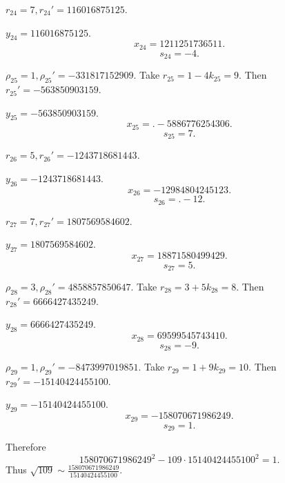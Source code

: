 \documentclass{article}
\theoremstyle{definition}
\theoremstyle{definition}
\begin{document}
$r_{24}=7, r_{24}'=116016875125$.

$y_{24}=116016875125$.
\[
x_{24} = 1211251736511.
\]
\[
s_{24} = -4.
\]

$\rho_{25}=1, \rho_{25}'=-331817152909$.
Take $r_{25}=1-4k_{25}=9$. Then
$r_{25}'=-563850903159$.

$y_{25}=-563850903159$.
\[
x_{25} = .-5886776254306.
\]
\[
s_{25} = 7.
\]

$r_{26}=5, r_{26}'=-1243718681443$.

$y_{26}=-1243718681443$.
\[
x_{26} = -12984804245123.
\]
\[
s_{26} = .-12.
\]

$r_{27}=7, r_{27}'=1807569584602$.

$y_{27}=1807569584602$.
\[
x_{27} = 18871580499429.
\]
\[
s_{27} = 5.
\]

$\rho_{28}=3, \rho_{28}'=4858857850647$.
Take $r_{28}=3+5k_{28}=8$. Then
$r_{28}'=6666427435249$.

$y_{28}=6666427435249$.
\[
x_{28} = 69599545743410.
\]
\[
s_{28} = -9.
\]

$\rho_{29}=1, \rho_{29}'=-8473997019851$.
Take $r_{29}=1+9k_{29}=10$.
Then $r_{29}'=-15140424455100$.

$y_{29}=-15140424455100$.
\[
x_{29} = -158070671986249.
\]
\[
s_{29} = 1.
\]

Therefore
\[
158070671986249^2 - 109 \cdot 15140424455100^2 = 1.
\]
Thus $\sqrt{109} \sim \frac{158070671986249}{15140424455100}$. 



\nocite{*}



\end{document}
